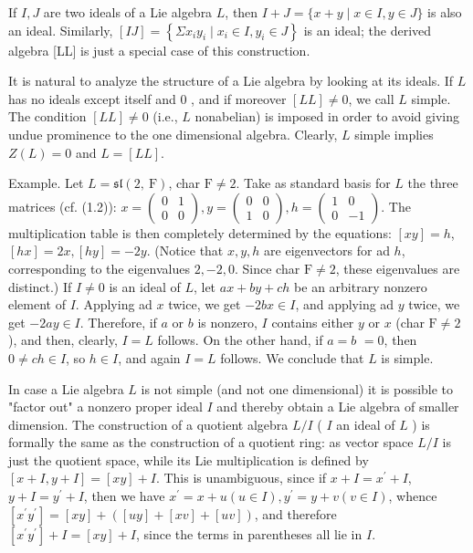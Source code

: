 \documentclass[10pt]{article}
\begin{document}
If $I, J$ are two ideals of a Lie algebra $L$, then $I+J=\{x+y \mid x \in I, y \in J\}$ is also an ideal. Similarly, $[I J]=\left\{\Sigma x_{i} y_{i} \mid x_{i} \in I, y_{i} \in J\right\}$ is an ideal; the derived algebra [LL] is just a special case of this construction.

It is natural to analyze the structure of a Lie algebra by looking at its ideals. If $L$ has no ideals except itself and 0 , and if moreover $[L L] \neq 0$, we call $L$ simple. The condition $[L L] \neq 0$ (i.e., $L$ nonabelian) is imposed in order to avoid giving undue prominence to the one dimensional algebra. Clearly, $L$ simple implies $Z(L)=0$ and $L=[L L]$.

Example. Let $L=\mathfrak{s l}(2, \mathrm{~F})$, char $\mathrm{F} \neq 2$. Take as standard basis for $L$ the three matrices (cf. (1.2)): $x=\left(\begin{array}{ll}0 & 1 \\ 0 & 0\end{array}\right), y=\left(\begin{array}{ll}0 & 0 \\ 1 & 0\end{array}\right), h=\left(\begin{array}{rr}1 & 0 \\ 0 & -1\end{array}\right)$. The multiplication table is then completely determined by the equations: $[x y]=h$, $[h x]=2 x,[h y]=-2 y$. (Notice that $x, y, h$ are eigenvectors for ad $h$, corresponding to the eigenvalues $2,-2,0$. Since char $\mathrm{F} \neq 2$, these eigenvalues are distinct.) If $I \neq 0$ is an ideal of $L$, let $a x+b y+c h$ be an arbitrary nonzero\\
element of $I$. Applying ad $x$ twice, we get $-2 b x \in I$, and applying ad $y$ twice, we get $-2 a y \in I$. Therefore, if $a$ or $b$ is nonzero, $I$ contains either $y$ or $x$ (char $\mathrm{F} \neq 2$ ), and then, clearly, $I=L$ follows. On the other hand, if $a=b$ $=0$, then $0 \neq c h \in I$, so $h \in I$, and again $I=L$ follows. We conclude that $L$ is simple.

In case a Lie algebra $L$ is not simple (and not one dimensional) it is possible to "factor out" a nonzero proper ideal $I$ and thereby obtain a Lie algebra of smaller dimension. The construction of a quotient algebra $L / I$ ( $I$ an ideal of $L$ ) is formally the same as the construction of a quotient ring: as vector space $L / I$ is just the quotient space, while its Lie multiplication is defined by $[x+I, y+I]=[x y]+I$. This is unambiguous, since if $x+I=x^{\prime}+I$, $y+I=y^{\prime}+I$, then we have $x^{\prime}=x+u(u \in I), y^{\prime}=y+v(v \in I)$, whence $\left[x^{\prime} y^{\prime}\right]=[x y]+([u y]+[x v]+[u v])$, and therefore $\left[x^{\prime} y^{\prime}\right]+I=[x y]+I$, since the terms in parentheses all lie in $I$.
\end{document}
